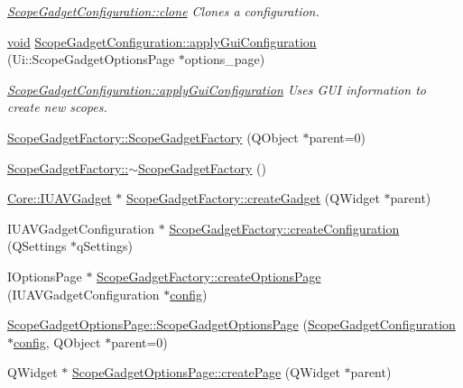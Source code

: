 \begin{DoxyCompactItemize}
\begin{DoxyCompactList}\small\item\em \hyperlink{group___scope_plugin_ga85df073ffa0cd27035a937df7c2cff8e}{Scope\-Gadget\-Configuration\-::clone} Clones a configuration. \end{DoxyCompactList}\item 
\hyperlink{group___u_a_v_objects_plugin_ga444cf2ff3f0ecbe028adce838d373f5c}{void} \hyperlink{group___scope_plugin_gaa68457b9b187faa4190e2f5d1343cbbb}{Scope\-Gadget\-Configuration\-::apply\-Gui\-Configuration} (Ui\-::\-Scope\-Gadget\-Options\-Page $\ast$options\-\_\-page)
\begin{DoxyCompactList}\small\item\em \hyperlink{group___scope_plugin_gaa68457b9b187faa4190e2f5d1343cbbb}{Scope\-Gadget\-Configuration\-::apply\-Gui\-Configuration} Uses G\-U\-I information to create new scopes. \end{DoxyCompactList}\item 
\hyperlink{group___scope_plugin_gace4d87876bb88a527c473e6f363a4a60}{Scope\-Gadget\-Factory\-::\-Scope\-Gadget\-Factory} (Q\-Object $\ast$parent=0)
\item 
\hyperlink{group___scope_plugin_gae7d925002f23646412ea50bf0a6c1658}{Scope\-Gadget\-Factory\-::$\sim$\-Scope\-Gadget\-Factory} ()
\item 
\hyperlink{class_core_1_1_i_u_a_v_gadget}{Core\-::\-I\-U\-A\-V\-Gadget} $\ast$ \hyperlink{group___scope_plugin_ga38da87ae88b0f1bd3ae63e997528ed56}{Scope\-Gadget\-Factory\-::create\-Gadget} (Q\-Widget $\ast$parent)
\item 
I\-U\-A\-V\-Gadget\-Configuration $\ast$ \hyperlink{group___scope_plugin_gacbb08116cc0c7390601e30b6cfde0cba}{Scope\-Gadget\-Factory\-::create\-Configuration} (Q\-Settings $\ast$q\-Settings)
\item 
I\-Options\-Page $\ast$ \hyperlink{group___scope_plugin_ga121b0d9857a168a0ad41f980d5c34b63}{Scope\-Gadget\-Factory\-::create\-Options\-Page} (I\-U\-A\-V\-Gadget\-Configuration $\ast$\hyperlink{deflate_8c_a4473b5227787415097004fd39f55185e}{config})
\item 
\hyperlink{group___scope_plugin_ga3680539fc8bb7716884d7e3da9caff3a}{Scope\-Gadget\-Options\-Page\-::\-Scope\-Gadget\-Options\-Page} (\hyperlink{class_scope_gadget_configuration}{Scope\-Gadget\-Configuration} $\ast$\hyperlink{deflate_8c_a4473b5227787415097004fd39f55185e}{config}, Q\-Object $\ast$parent=0)
\item 
Q\-Widget $\ast$ \hyperlink{group___scope_plugin_ga4032bc264c49c13a4bf81d5835a33206}{Scope\-Gadget\-Options\-Page\-::create\-Page} (Q\-Widget $\ast$parent)

\end{DoxyCompactItemize}
